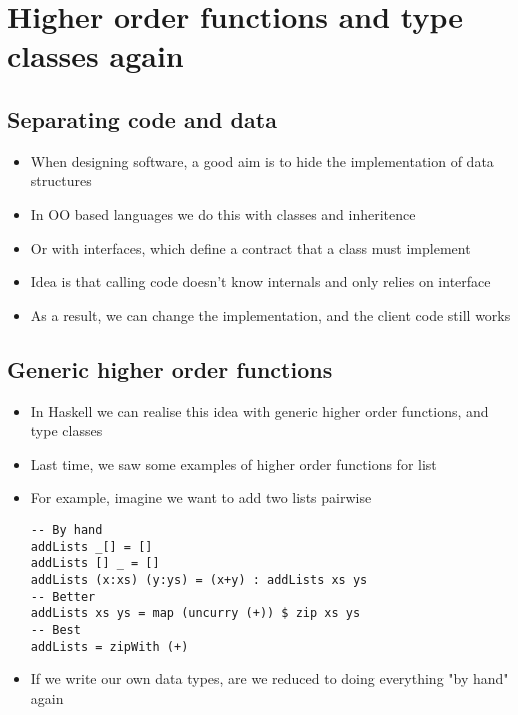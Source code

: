 \documentclass{article}[18pt]
\begin{document}
\section{Higher order functions and type classes again}
\subsection{Separating code and data}
\begin{itemize}
	\item When designing software, a good aim is to hide the implementation of data structures
	\item In OO based languages we do this with classes and inheritence
	\item Or with interfaces, which define a contract that a class must implement
	\item Idea is that calling code doesn't know internals and only relies on interface
	\item As a result, we can change the implementation, and the client code still works
\end{itemize}
\subsection{Generic higher order functions}
\begin{itemize}
	\item In Haskell we can realise this idea with generic higher order functions, and type classes
	\item Last time, we saw some examples of higher order functions for list
	\item For example, imagine we want to add two lists pairwise
\begin{verbatim}
-- By hand
addLists _[] = []
addLists [] _ = []
addLists (x:xs) (y:ys) = (x+y) : addLists xs ys
-- Better
addLists xs ys = map (uncurry (+)) $ zip xs ys
-- Best
addLists = zipWith (+)
\end{verbatim}
	\item If we write our own data types, are we reduced to doing everything "by hand" again
\end{itemize}
\end{document}
